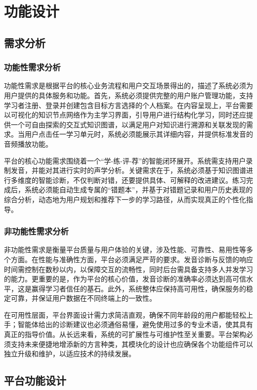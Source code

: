 
\chapter{功能设计}
\section{需求分析}
\subsection{功能性需求分析}
功能性需求是根据平台的核心业务流程和用户交互场景得出的，描述了系统必须为用户提供的具体服务和功能。首先，系统必须提供完整的用户账户管理功能，支持学习者注册、登录并创建包含目标方言选择的个人档案。在内容呈现上，平台需要以可视化的知识节点网络作为主学习界面，引导用户进行结构化学习，同时还应提供一个可自由探索的交互式知识图谱，以满足用户对知识进行溯源和关联发现的需求。当用户点击任一学习单元时，系统必须能展示其详细内容，并提供标准发音的音频播放功能。

平台的核心功能需求围绕着一个“学-练-评-荐”的智能闭环展开。系统需支持用户录制发音，并能对其进行实时的声学分析。关键需求在于，系统必须基于知识图谱进行多维度的智能诊断，不仅判断对错，还要提供具体、可解释的改进建议。练习完成后，系统必须能自动生成专属的“错题本”，并基于对错题记录和用户历史表现的综合分析，动态地为用户规划和推荐下一步的学习路径，从而实现真正的个性化指导。

\subsection{非功能性需求分析}
非功能性需求是衡量平台质量与用户体验的关键，涉及性能、可靠性、易用性等多个方面。在性能与准确性方面，平台必须满足严苛的要求。发音诊断与反馈的响应时间需控制在数秒以内，以保障交互的流畅性，同时后台需具备支持多人并发学习的能力。更重要的是，作为平台的核心价值，发音诊断的准确率必须达到高可信水平，这是赢得学习者信任的基石。此外，系统整体应保持高可用性，确保服务的稳定可靠，并保证用户数据在不同终端上的一致性。

在可用性层面，平台界面设计需力求简洁直观，确保不同年龄段的用户都能轻松上手；智能体给出的诊断建议也必须通俗易懂，避免使用过多的专业术语，使其具有真正的指导价值。从长远来看，系统的可扩展性与可维护性至关重要。平台架构必须支持未来便捷地增添新的方言种类，其模块化的设计也应确保各个功能组件可以独立升级和维护，以适应技术的持续发展。

\section{平台功能设计}

